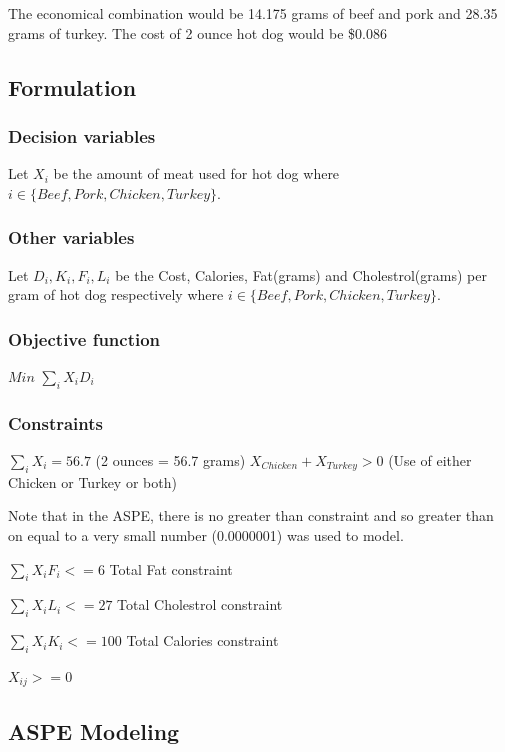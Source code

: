 \documentclass[]{article}
\begin{document}
The economical combination would be 14.175 grams of beef and pork and
28.35 grams of turkey. The cost of 2 ounce hot dog would be \$0.086

\subsection{Formulation}\label{formulation-1}

\subsubsection{Decision variables}\label{decision-variables-1}

Let \(X_{i}\) be the amount of meat used for hot dog where
\(i \in \{Beef,Pork, Chicken, Turkey\}\).

\subsubsection{Other variables}\label{other-variables-1}

Let \(D_{i},K_{i},F_{i},L_{i}\) be the Cost, Calories, Fat(grams) and
Cholestrol(grams) per gram of hot dog respectively where
\(i \in \{Beef,Pork, Chicken, Turkey\}\).

\subsubsection{Objective function}\label{objective-function-1}

\(Min\) \(\sum_{i}X_{i}D_{i}\)

\subsubsection{Constraints}\label{constraints-1}

\(\sum_{i}X_{i} = 56.7\) (2 ounces = 56.7 grams)
\(X_{Chicken} + X_{Turkey} > 0\) (Use of either Chicken or Turkey or
both)

Note that in the ASPE, there is no greater than constraint and so
greater than on equal to a very small number (0.0000001) was used to
model.

\(\sum_{i}X_{i}F_{i} <= 6\) Total Fat constraint

\(\sum_{i}X_{i}L_{i} <= 27\) Total Cholestrol constraint

\(\sum_{i}X_{i}K_{i} <= 100\) Total Calories constraint

\(X_{ij} > = 0\)

\subsection{ASPE Modeling}\label{aspe-modeling}
\end{document}
